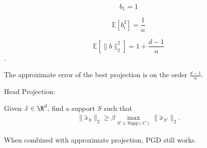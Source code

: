 $$b_1 = 1$$

$$\mathbb{E}[b_i^2] = \frac{1}{n}$$

$$\mathbb{E}[ \|b \|_2^2] = 1 + \frac{d-1}{n}$$.


The approximate error of the best projection is on the order $\frac{d-1}{n}$.

\begin{definition}
Head Projection:

Given $\tilde{x} \in \R^d,$ find a support $S$ such that
\begin{align}
\| \tilde{x}_S \|_2 \geq \beta \max_{S' \in \text{Supp}(C)} \| \tilde{x}_{S'} \|_2.
\end{align}
\end{definition}

When combined with approximate projection, PGD still works.

